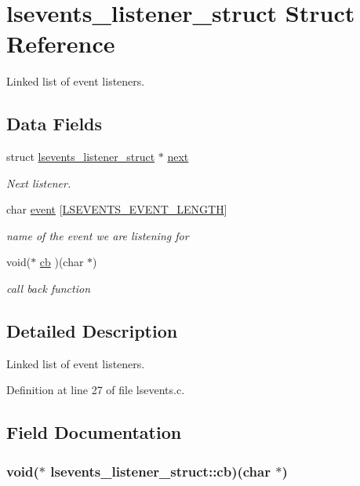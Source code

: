\hypertarget{structlsevents__listener__struct}{\section{lsevents\-\_\-listener\-\_\-struct Struct Reference}
\label{structlsevents__listener__struct}
}


Linked list of event listeners.  


\subsection*{Data Fields}
\begin{DoxyCompactItemize}
\item 
struct \hyperlink{structlsevents__listener__struct}{lsevents\-\_\-listener\-\_\-struct} $\ast$ \hyperlink{structlsevents__listener__struct_a8aed9196b0deab84e018b96c0cc59305}{next}
\begin{DoxyCompactList}\small\item\em Next listener. \end{DoxyCompactList}\item 
char \hyperlink{structlsevents__listener__struct_a270117dccadeda0164592c753dae15a1}{event} \mbox{[}\hyperlink{pgpmac_8h_ab61d790b5572f116e091babfda53627b}{L\-S\-E\-V\-E\-N\-T\-S\-\_\-\-E\-V\-E\-N\-T\-\_\-\-L\-E\-N\-G\-T\-H}\mbox{]}
\begin{DoxyCompactList}\small\item\em name of the event we are listening for \end{DoxyCompactList}\item 
void($\ast$ \hyperlink{structlsevents__listener__struct_a005906c1c9f0647e6ed1fb4592d8c5d0}{cb} )(char $\ast$)
\begin{DoxyCompactList}\small\item\em call back function \end{DoxyCompactList}\end{DoxyCompactItemize}


\subsection{Detailed Description}
Linked list of event listeners. 

Definition at line 27 of file lsevents.\-c.



\subsection{Field Documentation}
\hypertarget{structlsevents__listener__struct_a005906c1c9f0647e6ed1fb4592d8c5d0}{
\subsubsection[{cb}]{\setlength{\rightskip}{0pt plus 5cm}void($\ast$ lsevents\-\_\-listener\-\_\-struct\-::cb)(char $\ast$)}}\label{structlsevents__listener__struct_a005906c1c9f0647e6ed1fb4592d8c5d0}


